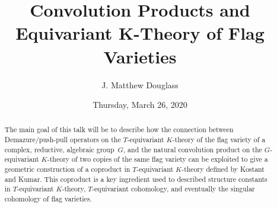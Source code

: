\documentclass{UAmathtalk}
\author{J. Matthew Douglass}
\title{Convolution Products and Equivariant K-Theory of Flag Varieties}
\date{Thursday, March 26, 2020}
\begin{document}
\maketitle

\begin{abstract}
The main goal of this talk will be to describe how the connection between Demazure/push-pull operators on the $T$-equivariant $K$-theory of the flag variety of a complex, reductive, algebraic group~$G$, and the natural convolution product on the $G$-equivariant $K$-theory of two copies of the same flag variety can be exploited to give a geometric construction of a coproduct in $T$-equivariant $K$-theory defined by Kostant and Kumar. This coproduct is a key ingredient used to described structure constants in $T$-equivariant $K$-theory, $T$-equivariant cohomology, and eventually the singular cohomology of flag varieties.
\end{abstract}
\end{document}
